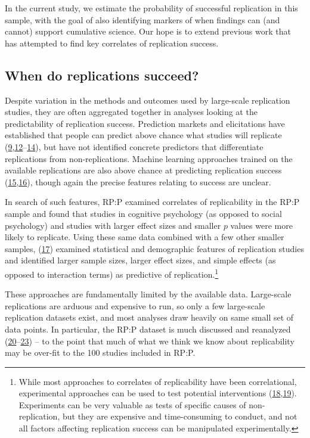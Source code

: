 \documentclass[
  english,
  a4paper,
]{article}
\begin{document}
In the current study, we estimate the probability of successful replication in this sample, with the goal of also identifying markers of when findings can (and cannot) support cumulative science. Our hope is to extend previous work that has attempted to find key correlates of replication success.

\hypertarget{when-do-replications-succeed}{%
\subsection{When do replications succeed?}\label{when-do-replications-succeed}}

Despite variation in the methods and outcomes used by large-scale replication studies, they are often aggregated together in analyses looking at the predictability of replication success. Prediction markets and elicitations have established that people can predict above chance what studies will replicate (\protect\hyperlink{ref-camerer2018}{9},\protect\hyperlink{ref-hoogeveen2019}{12}--\protect\hyperlink{ref-forsell2019}{14}), but have not identified concrete predictors that differentiate replications from non-replications. Machine learning approaches trained on the available replications are also above chance at predicting replication success (\protect\hyperlink{ref-yang2020}{15},\protect\hyperlink{ref-youyou2023}{16}), though again the precise features relating to success are unclear.

In search of such features, RP:P examined correlates of replicability in the RP:P sample and found that studies in cognitive psychology (as opposed to social psychology) and studies with larger effect sizes and smaller \(p\) values were more likely to replicate. Using these same data combined with a few other smaller samples, (\protect\hyperlink{ref-altmejd2019}{17}) examined statistical and demographic features of replication studies and identified larger sample sizes, larger effect sizes, and simple effects (as opposed to interaction terms) as predictive of replication.\footnote{While most approaches to correlates of replicability have been correlational, experimental approaches can be used to test potential interventions (\protect\hyperlink{ref-protzko2020}{18},\protect\hyperlink{ref-ebersole2020}{19}). Experiments can be very valuable as tests of specific causes of non-replication, but they are expensive and time-consuming to conduct, and not all factors affecting replication success can be manipulated experimentally.}

These approaches are fundamentally limited by the available data. Large-scale replications are arduous and expensive to run, so only a few large-scale replication datasets exist, and most analyses draw heavily on same small set of data points. In particular, the RP:P dataset is much discussed and reanalyzed (\protect\hyperlink{ref-etz2016}{20}--\protect\hyperlink{ref-anderson2016}{23}) -- to the point that much of what we think we know about replicability may be over-fit to the 100 studies included in RP:P.
\end{document}
